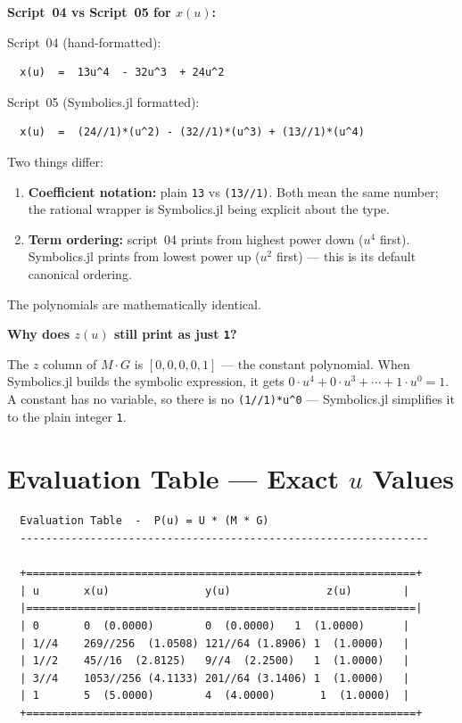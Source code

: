 \documentclass[12pt, a4paper]{article}
\newcommand{\cd}[1]{\texttt{#1}}
\begin{document}
\begin{examplebox}
\textbf{Script~04 vs Script~05 for $x(u)$:}

\medskip
Script~04 (hand-formatted):
\begin{verbatim}
  x(u)  =  13u^4  - 32u^3  + 24u^2
\end{verbatim}

Script~05 (Symbolics.jl formatted):
\begin{verbatim}
  x(u)  =  (24//1)*(u^2) - (32//1)*(u^3) + (13//1)*(u^4)
\end{verbatim}

Two things differ:
\begin{enumerate}
  \item \textbf{Coefficient notation:} plain \cd{13} vs
        \cd{(13//1)}.
        Both mean the same number; the rational wrapper
        is Symbolics.jl being explicit about the type.
  \item \textbf{Term ordering:} script~04 prints from
        highest power down ($u^4$ first).
        Symbolics.jl prints from lowest power up
        ($u^2$ first) --- this is its default canonical ordering.
\end{enumerate}

The polynomials are mathematically identical.
\end{examplebox}

\begin{notebox}
\textbf{Why does $z(u)$ still print as just \cd{1}?}

The $z$ column of $M \cdot G$ is $[0, 0, 0, 0, 1]$ ---
the constant polynomial.
When Symbolics.jl builds the symbolic expression, it gets
$0 \cdot u^4 + 0 \cdot u^3 + \cdots + 1 \cdot u^0 = 1$.
A constant has no variable, so there is no \cd{(1//1)*u\^{}0}
--- Symbolics.jl simplifies it to the plain integer \cd{1}.
\end{notebox}


\section{Evaluation Table --- Exact $u$ Values}

\begin{verbatim}
  Evaluation Table  -  P(u) = U * (M * G)
  ----------------------------------------------------------------

  +=============================================================+
  | u       x(u)               y(u)               z(u)        |
  |=============================================================|
  | 0       0  (0.0000)        0  (0.0000)   1  (1.0000)      |
  | 1//4    269//256  (1.0508) 121//64 (1.8906) 1  (1.0000)   |
  | 1//2    45//16  (2.8125)   9//4  (2.2500)   1  (1.0000)   |
  | 3//4    1053//256 (4.1133) 201//64 (3.1406) 1  (1.0000)   |
  | 1       5  (5.0000)        4  (4.0000)       1  (1.0000)  |
  +=============================================================+
\end{verbatim}
\end{document}
